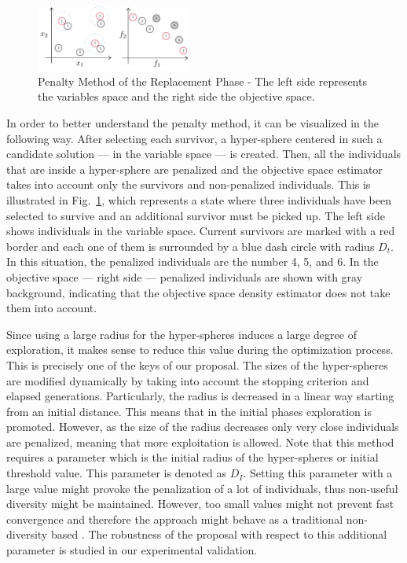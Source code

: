 \begin{figure}[t]
\centering
%
%
\includegraphics[width=0.45\textwidth]{Images/Diagram.pdf}
\caption{Penalty Method of the Replacement Phase - The left side represents the variables space and the right side the 
objective space.} \label{fig:Hypersphere}
\end{figure}



In order to better understand the penalty method, it can be visualized in the following way.
%
After selecting each survivor, a hyper-sphere 
centered in such a candidate solution --- in the variable space --- is created.
%
Then, all the individuals that are inside a hyper-sphere are penalized and the objective space estimator takes 
into account only the survivors and non-penalized individuals.
%
This is illustrated in Fig.~\ref{fig:Hypersphere}, which represents a state where three individuals have been 
selected to survive and an additional survivor must be picked up.
%
The left side shows individuals in the variable space.
%
Current survivors are marked with a red border and each one of them is surrounded by a blue dash circle with 
radius $D_t$.
%
In this situation, the penalized individuals are the number 4, 5, and 6.
%
In the objective space --- right side --- penalized individuals are shown with gray background, indicating
that the objective space density estimator does not take them into account.

Since using a large radius for the hyper-spheres induces a large degree of 
exploration, it makes sense to reduce this value during the optimization process.
%
This is precisely one of the keys of our proposal.
%
The sizes of the hyper-spheres are modified dynamically by taking into account the stopping 
criterion and elapsed generations.
%
Particularly, the radius is decreased in a linear way starting from an initial distance.
%
This means that in the initial phases exploration is promoted.
%
However, as the size of the radius decreases only very close individuals are penalized, meaning that more 
exploitation is allowed.
%
Note that this method requires a parameter which is the initial radius of the 
hyper-spheres or initial threshold value.
%
This parameter is denoted as $D_I$. 
%
Setting this parameter with a large value might provoke the penalization of a lot of individuals,
thus non-useful diversity might be maintained.
%
However, too small values might not prevent fast convergence and therefore the approach  
might behave as a traditional non-diversity based \MOEA{}.
%
The robustness of the proposal with respect to this additional parameter is studied in our experimental validation.

